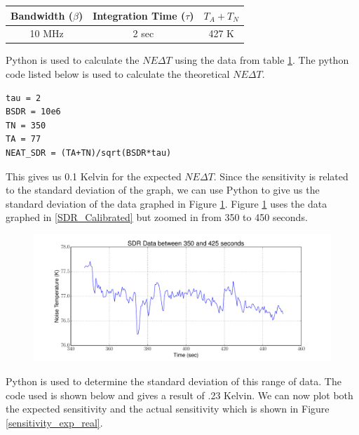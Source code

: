 {\begin{table}[h!tb] \centering
{}
\label{exp2_param}
\begin{tabular}{ccc} \hline
\textbf{Bandwidth ($\beta$)} & \textbf{Integration Time ($\tau$)} & \textbf{$T_{A}+T_{N}$}\\ \hline
10 MHz & 2 sec & 427 K \\ \hline
\end{tabular}
\end{table}

Python is used to calculate the $NE\Delta T$ using the data from table \ref{exp2_param}.  The python code listed below is used to calculate the theoretical $NE\Delta T$.

\begin{lstlisting}[frame=single,keywordstyle=\color{blue}]
tau = 2
BSDR = 10e6
TN = 350
TA = 77
NEAT_SDR = (TA+TN)/sqrt(BSDR*tau)
\end{lstlisting}

This gives us 0.1 Kelvin for the expected $NE\Delta T$.  Since the sensitivity is related to the standard deviation of the graph, we can use Python to give us the standard deviation of the data graphed in Figure \ref{Sensitivity_graph}.  Figure \ref{Sensitivity_graph} uses the data graphed in \ref{SDR_Calibrated} but zoomed in from 350 to 450 seconds. 

\begin{figure}[h!tb] \centering
\includegraphics[width=\textwidth]{Experiments/Exp1/SDR_Zoom.pdf}
\label{Sensitivity_graph}
\end{figure}

Python is used to determine the standard deviation of this range of data.  The code used is shown below and gives a result of .23 Kelvin.  We can now plot both the expected sensitivity and the actual sensitivity which is shown in Figure \ref{sensitivity_exp_real}.

}
